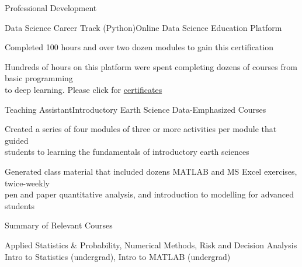 \documentclass{resume} %
\begin{document}
\begin{rSection}{Professional Development} 

\begin{rSubsection}{Data Science Career Track (Python)}{}{Online Data Science Education Platform}{}
\item {Completed 100 hours and over two dozen modules to gain this certification}
\item {Hundreds of hours on this platform were spent completing dozens of courses from basic programming \\ to deep learning. Please click for \href{https://github.com/907Resident/Certifications}{certificates}}
\end{rSubsection}


\begin{rSubsection}{Teaching Assistant}{}{Introductory Earth Science Data-Emphasized Courses}{}
\item {Created a series of four modules of three or more activities per module that guided \\ students to learning the fundamentals of introductory earth sciences}
\item {Generated class material that included dozens MATLAB and MS Excel exercises, twice-weekly \\ pen and paper quantitative analysis, and introduction to modelling for advanced students}
\end{rSubsection}


\begin{rSubsection}{Summary of Relevant Courses}{}{}{}
\item {Applied Statistics \& Probability, Numerical Methods, Risk and Decision Analysis \\ Intro to Statistics (undergrad), Intro to MATLAB (undergrad)}

\end{rSubsection}


\end{rSection} 
\end{document}
